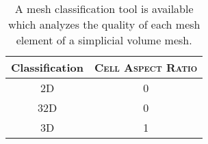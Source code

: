\begin{table}[!ht]
\begin{center}
\begin{tabular}{|c|c|}
\hline
\textbf{Classification} & \textsc{Cell Aspect Ratio}\\  
\hline
\textsc{2D}         &        0 \\
\textsc{32D}        &        0 \\
\textsc{3D}         &        1 \\
\hline
\end{tabular}
\end{center}
\caption{A mesh classification tool is available which analyzes the quality of 
each mesh element of a simplicial volume mesh.}
\end{table} 

